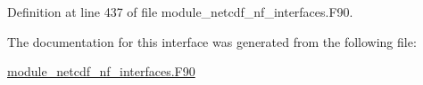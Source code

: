 Definition at line 437 of file module\+\_\+netcdf\+\_\+nf\+\_\+interfaces.\+F90.



The documentation for this interface was generated from the following file\+:\begin{DoxyCompactItemize}
\item 
\hyperlink{module__netcdf__nf__interfaces_8F90}{module\+\_\+netcdf\+\_\+nf\+\_\+interfaces.\+F90}\end{DoxyCompactItemize}
